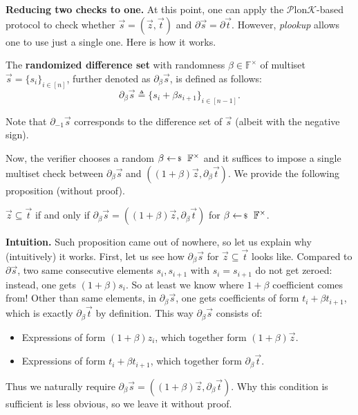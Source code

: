 \documentclass[../../book]{subfiles}
\begin{document}
\textbf{Reducing two checks to one.} At this point, one can apply the
$\mathcal{P}$lon$\mathcal{K}$-based protocol to check whether $\vec{s} =
(\vec{z}, \vec{t})$ and $\partial\vec{s} = \partial\vec{t}$. However,
\textit{plookup} allows one to use just a single one. Here is how it works.

\begin{definition}
    The \textbf{randomized difference set} with randomness $\beta \in
    \mathbb{F}^{\times}$ of multiset $\vec{s}=\{s_i\}_{i \in [n]}$, further
    denoted as $\partial_{\beta}\vec{s}$, is defined as follows:
    \begin{equation*}
        \partial_{\beta}\vec{s} \triangleq \{s_i+\beta s_{i+1}\}_{i \in [n-1]}.
    \end{equation*}
\end{definition}

\begin{remark}
    Note that $\partial_{-1}\vec{s}$ corresponds to the difference set
    of $\vec{s}$ (albeit with the negative sign).
\end{remark}

Now, the verifier chooses a random $\beta \leftarrowS \mathbb{F}^{\times}$ and
it suffices to impose a single multiset check between $\partial_{\beta}\vec{s}$
and $((1+\beta)\vec{z},\partial_{\beta}\vec{t})$. We provide the following
proposition (without proof).
\begin{proposition}
    $\vec{z} \subseteq \vec{t}$ if and only if $\partial_{\beta}\vec{s} =
    ((1+\beta)\vec{z},\partial_{\beta}\vec{t})$ for $\beta \leftarrowS
    \mathbb{F}^{\times}$.
\end{proposition}

\textbf{Intuition.} Such proposition came out of nowhere, so let us explain why
(intuitively) it works. First, let us see how $\partial_{\beta}\vec{s}$ for
$\vec{z} \subseteq \vec{t}$ looks like. Compared to $\partial\vec{s}$, two same
consecutive elements $s_i,s_{i+1}$ with $s_i=s_{i+1}$ do not get zeroed: instead,
one gets $(1+\beta)s_i$. So at least we know where $1+\beta$ coefficient comes
from! Other than same elements, in $\partial_{\beta}\vec{s}$, one gets
coefficients of form $t_i+\beta t_{i+1}$, which is exactly
$\partial_{\beta}\vec{t}$ by definition. This way $\partial_{\beta}\vec{s}$ consists of:
\begin{itemize}
    \item Expressions of form $(1+\beta)z_i$, which together form $(1+\beta)\vec{z}$.
    \item Expressions of form $t_i+\beta t_{i+1}$, which together form
    $\partial_{\beta}\vec{t}$.
\end{itemize}
Thus we naturally require $\partial_{\beta}\vec{s} =
((1+\beta)\vec{z},\partial_{\beta}\vec{t})$. Why this condition is sufficient is
less obvious, so we leave it without proof.
\end{document}
